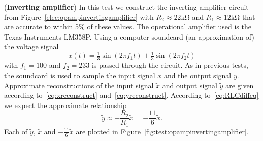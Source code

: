 \begin{randomfloat}
\begin{test}\label{test:opampinvertingamplifiertest1} 
(\textbf{Inverting amplifier})
In this test we construct the inverting amplifier circuit from Figure~\ref{elec:opampinvertingamplifier} with $R_2 \approx 22\si{\kilo\ohm}$ and $R_1\approx 12\si{\kilo\ohm}$ that are accurate to within 5\% of these values.  The operational amplifier used is the Texas Instruments LM358P.  Using a computer soundcard (an approximation of) the voltage signal
\[
x(t) = \tfrac{1}{3}\sin( 2 \pi f_1 t) + \tfrac{1}{3}\sin( 2\pi f_2 t)
\]
with $f_1 = 100$ and $f_2 = 233$ is passed through the circuit.  As in previous tests, the soundcard is used to sample the input signal $x$ and the output signal $y$. Approximate reconstructions of the input signal $\tilde{x}$ and output signal $\tilde{y}$ are given according to~\eqref{eq:xreconstruct} and~\eqref{eq:yreconstruct}.  According to~\eqref{eq:RLCdiffeq} we expect the approximate relationship
\[
\tilde{y} \approx -\frac{R_2}{R_1} \tilde{x} = -\frac{11}{6}\tilde{x}.
\]
Each of $\tilde{y}$, $\tilde{x}$ and $-\tfrac{11}{6}\tilde{x}$ are plotted in Figure~\ref{fig:test:opampinvertingamplifier}.  %

\begin{center}
\captionsetup{type=figure}
\label{fig:test:opampinvertingamplifier}
\end{center}
\end{test}
\end{randomfloat}

